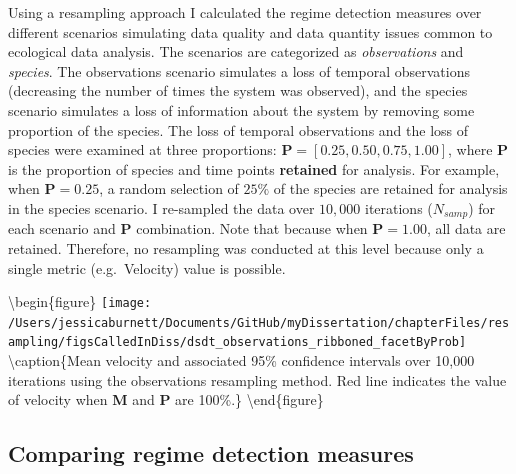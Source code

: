 \documentclass[12pt,twoside,openany]{reedthesis}
\begin{document}
Using a resampling approach I calculated the regime detection measures over different scenarios simulating data quality and data quantity issues common to ecological data analysis. The scenarios are categorized as \emph{observations} and \emph{species}. The observations scenario simulates a loss of temporal observations (decreasing the number of times the system was observed), and the species scenario simulates a loss of information about the system by removing some proportion of the species. The loss of temporal observations and the loss of species were examined at three proportions: \(\textbf{P} = [0.25, 0.50, 0.75, 1.00]\), where \(\textbf{P}\) is the proportion of species and time points \textbf{retained} for analysis. For example, when \(\textbf{P} = 0.25\), a random selection of \(25\%\) of the species are retained for analysis in the species scenario. I re-sampled the data over \(10,000\) iterations (\(N_{samp}\)) for each scenario and \(\textbf{P}\) combination. Note that because when \(\textbf{P} = 1.00\), all data are retained. Therefore, no resampling was conducted at this level because only a single metric (e.g.~Velocity) value is possible.

\textbackslash begin\{figure\}
\texttt{[image: /Users/jessicaburnett/Documents/GitHub/myDissertation/chapterFiles/resampling/figsCalledInDiss/dsdt\_observations\_ribboned\_facetByProb]} \textbackslash caption\{Mean velocity and associated 95\% confidence intervals over 10,000 iterations using the observations resampling method. Red line indicates the value of velocity when \textbf{M} and \textbf{P} are 100\%.\}\label{fig:dsdtResamp}
\textbackslash end\{figure\}

\hypertarget{comparing-regime-detection-measures}{%
\subsection{Comparing regime detection measures}\label{comparing-regime-detection-measures}}
\end{document}

